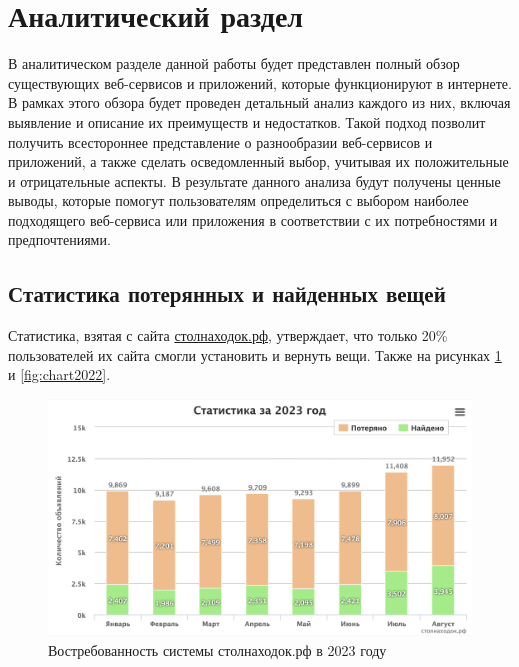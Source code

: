 \documentclass{mirea}
\begin{document}
\section{Аналитический раздел}

В аналитическом разделе данной работы будет представлен полный обзор существующих веб-сервисов и приложений, которые функционируют в интернете. В рамках этого обзора будет проведен детальный анализ каждого из них, включая выявление и описание их преимуществ и недостатков. Такой подход позволит получить всестороннее представление о разнообразии веб-сервисов и приложений, а также сделать осведомленный выбор, учитывая их положительные и отрицательные аспекты. В результате данного анализа будут получены ценные выводы, которые помогут пользователям определиться с выбором наиболее подходящего веб-сервиса или приложения в соответствии с их потребностями и предпочтениями.

\subsection{Статистика потерянных и найденных вещей}

Статистика, взятая с сайта \href{http://xn--80aisbkedbuk1b.xn--p1ai/}{столнаходок.рф}, утверждает, что только 20\% пользователей их сайта смогли установить и вернуть вещи. Также на рисунках \ref{fig:chart2023} и \ref{fig:chart2022}.

\begin{figure}[htb]
	\centering
	\includegraphics[width=.95\textwidth]{images/chart2023}
	\parskip=6pt
	\caption{Востребованность системы столнаходок.рф в 2023 году}
	\label{fig:chart2023}
\end{figure}
\end{document}

